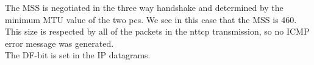 The MSS is negotiated in the three way handshake and determined by the minimum MTU value of the two pcs. We see in this case that the MSS is 460. \\
This size is respected by all of the packets in the nttcp transmission, so no ICMP error message was generated. \\

The DF-bit is set in the IP datagrams.
